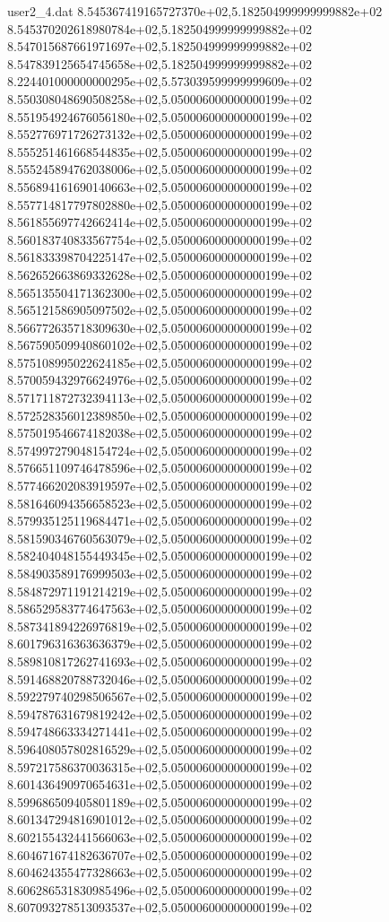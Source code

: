 \begin{filecontents}{user2_4.dat}
8.545367419165727370e+02,5.182504999999999882e+02
8.545370202618980784e+02,5.182504999999999882e+02
8.547015687661971697e+02,5.182504999999999882e+02
8.547839125654745658e+02,5.182504999999999882e+02
8.224401000000000295e+02,5.573039599999999609e+02
8.550308048690508258e+02,5.050006000000000199e+02
8.551954924676056180e+02,5.050006000000000199e+02
8.552776971726273132e+02,5.050006000000000199e+02
8.555251461668544835e+02,5.050006000000000199e+02
8.555245894762038006e+02,5.050006000000000199e+02
8.556894161690140663e+02,5.050006000000000199e+02
8.557714817797802880e+02,5.050006000000000199e+02
8.561855697742662414e+02,5.050006000000000199e+02
8.560183740833567754e+02,5.050006000000000199e+02
8.561833398704225147e+02,5.050006000000000199e+02
8.562652663869332628e+02,5.050006000000000199e+02
8.565135504171362300e+02,5.050006000000000199e+02
8.565121586905097502e+02,5.050006000000000199e+02
8.566772635718309630e+02,5.050006000000000199e+02
8.567590509940860102e+02,5.050006000000000199e+02
8.575108995022624185e+02,5.050006000000000199e+02
8.570059432976624976e+02,5.050006000000000199e+02
8.571711872732394113e+02,5.050006000000000199e+02
8.572528356012389850e+02,5.050006000000000199e+02
8.575019546674182038e+02,5.050006000000000199e+02
8.574997279048154724e+02,5.050006000000000199e+02
8.576651109746478596e+02,5.050006000000000199e+02
8.577466202083919597e+02,5.050006000000000199e+02
8.581646094356658523e+02,5.050006000000000199e+02
8.579935125119684471e+02,5.050006000000000199e+02
8.581590346760563079e+02,5.050006000000000199e+02
8.582404048155449345e+02,5.050006000000000199e+02
8.584903589176999503e+02,5.050006000000000199e+02
8.584872971191214219e+02,5.050006000000000199e+02
8.586529583774647563e+02,5.050006000000000199e+02
8.587341894226976819e+02,5.050006000000000199e+02
8.601796316363636379e+02,5.050006000000000199e+02
8.589810817262741693e+02,5.050006000000000199e+02
8.591468820788732046e+02,5.050006000000000199e+02
8.592279740298506567e+02,5.050006000000000199e+02
8.594787631679819242e+02,5.050006000000000199e+02
8.594748663334271441e+02,5.050006000000000199e+02
8.596408057802816529e+02,5.050006000000000199e+02
8.597217586370036315e+02,5.050006000000000199e+02
8.601436490970654631e+02,5.050006000000000199e+02
8.599686509405801189e+02,5.050006000000000199e+02
8.601347294816901012e+02,5.050006000000000199e+02
8.602155432441566063e+02,5.050006000000000199e+02
8.604671674182636707e+02,5.050006000000000199e+02
8.604624355477328663e+02,5.050006000000000199e+02
8.606286531830985496e+02,5.050006000000000199e+02
8.607093278513093537e+02,5.050006000000000199e+02

\end{filecontents}
